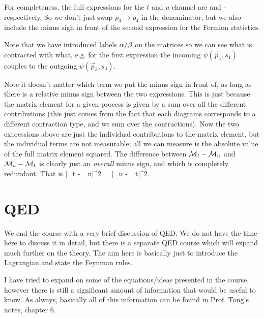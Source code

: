    For completeness, the full expressions for the $t$ and $u$ channel are \bse 
    \ese 
    and 
    \bse
        -
    \ese 
    respectively. So we don't just swap $p_3\to p_4$ in the denominator, but we also include the minus sign in front of the second expression for the Fermion statistics. 
\eex 


\br 
    Note that we have introduced labels $\alpha/\beta$ on the matrices so we can see what is contracted with what, e.g. for the first expression the incoming $\psi(\vec{p}_1,s_1)$ couples to the outgoing $\psi(\vec{p}_3,s_3)$.
\er 

\br 
    Note it doesn't matter which term we put the minus sign in front of, as long as there is a relative minus sign between the two expressions. This is just because the matrix element for a given process is given by a sum over all the different contributions (this just comes from the fact that each diagrams corresponds to a different contraction type, and we sum over the contractions). Now the two expressions above are just the individual contributions to the matrix element, but the individual terms are not measurable; all we can measure is the absolute value of the full matrix element squared. The difference between $\mathcal{M}_t - \mathcal{M}_u$ and $\mathcal{M}_u - \mathcal{M}_t$ is clearly just an \textit{overall} minus sign, and which is completely redundant. That is 
    \bse 
        |\cM_t - \cM_u|^2 = |\cM_u - \cM_t|^2.
    \ese 
\er 



\section{QED}

We end the course with a very brief discussion of QED. We do not have the time here to discuss it in detail, but there is a separate QED course which will expand much further on the theory. The aim here is basically just to introduce the Lagrangian and state the Feynman rules. 

\br 
    I have tried to expand on some of the equations/ideas presented in the course, however there is still a significant amount of information that would be useful to know. As always, basically all of this information can be found in Prof. Tong's notes, chapter 6.
\er 

